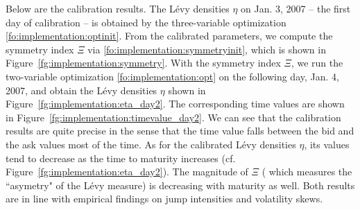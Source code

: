 \documentclass{article}
\numberwithin{equation}{section}
\begin{document}
Below are the calibration results. The L\'{e}vy densities $\eta$ on Jan. 3, 2007 -- the first day of calibration -- is obtained by the three-variable optimization \eqref{fo:implementation:optinit}. From the calibrated parameters, we compute the symmetry index $\Xi$ via \eqref{fo:implementation:symmetryinit}, which is shown in Figure~\ref{fg:implementation:symmetry}. With the symmetry index $\Xi$, we run the two-variable optimization \eqref{fo:implementation:opt} on the following day, Jan. 4, 2007, and obtain the L\'{e}vy densities $\eta$ shown in Figure~\ref{fg:implementation:eta_day2}. The corresponding time values are shown in Figure~\ref{fg:implementation:timevalue_day2}.
We can see that the calibration results are quite precise in the sense that the time value falls between the bid and the ask values most of the time. As for the calibrated L\'{e}vy densities $\eta$, its values tend to decrease as the time to maturity increases (cf. Figure~\ref{fg:implementation:eta_day2}). The magnitude of $\Xi$ ( which measures the ``asymetry" of the L\'evy measure) is decreasing with maturity as well. Both results are in line with empirical findings on jump intensities and volatility skews.  
\end{document}
